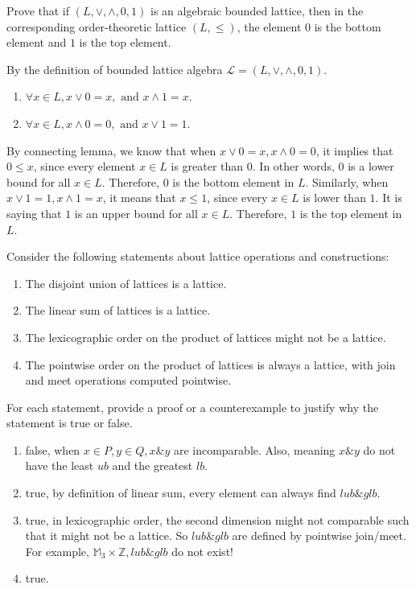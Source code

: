 \documentclass[11pt,a4paper]{exam}
\newcommand{\Z}{\mathbb{Z}}
\newcommand{\join}{\vee}
\newcommand{\meet}{\wedge}
\begin{document}
\begin{exo}
    Prove that if $(L, \join, \meet, 0, 1)$ is an algebraic bounded lattice, then in the corresponding order-theoretic lattice $(L, \leq)$, the element $0$ is the bottom element and $1$ is the top element.

    \begin{sol}
        By the definition of bounded lattice algebra $\mathcal{L} = (L, \join, \meet, 0, 1)$. 
        \begin{enumerate}
            \item $\forall x \in L, x \join 0 = x, \text{ and } x \meet 1 = x$.
            \item $\forall x \in L, x \meet 0 = 0, \text{ and } x \join 1 = 1$.
        \end{enumerate}
        By connecting lemma, we know that when $x \join 0 = x, x \meet 0 = 0$, it implies that $0 \leq x$, since every element $x \in L$ is greater than 0. In other words, $0$ is a lower bound for all $x \in L$. Therefore, $0$ is the bottom element in $L$.
        Similarly, when $x \join 1 = 1, x \meet 1 = x$, it means that $x \leq 1$, since every $x \in L$ is lower than $1$. It is saying that $1$ is an upper bound for all $x \in L$. Therefore, $1$ is the top element in $L$.
    \end{sol}
\end{exo}

\begin{exo}
    Consider the following statements about lattice operations and constructions:
    \begin{enumerate}
        \item The disjoint union of lattices is a lattice.
        \item The linear sum of lattices is a lattice.
        \item The lexicographic order on the product of lattices might not be a lattice.
        \item The pointwise order on the product of lattices is always a lattice, with join and meet operations computed pointwise.
    \end{enumerate}
    For each statement, provide a proof or a counterexample to justify why the statement is true or false.

    \begin{sol}
        \begin{enumerate}
            \item false, when $x \in P, y \in Q, x \& y$ are incomparable. Also, meaning $x \& y$ do not have the least $ub$ and the greatest $lb$.
            \item true, by definition of linear sum, every element can always find $lub \& glb$.
            \item true, in lexicographic order, the second dimension might not comparable such that it might not be a lattice. So $lub \& glb$ are defined by pointwise join/meet. For example, $\mathbb{M}_3 \times \Z, lub \& glb$ do not exist! 
            \item true.
        \end{enumerate}
    \end{sol}
\end{exo}
\end{document}
